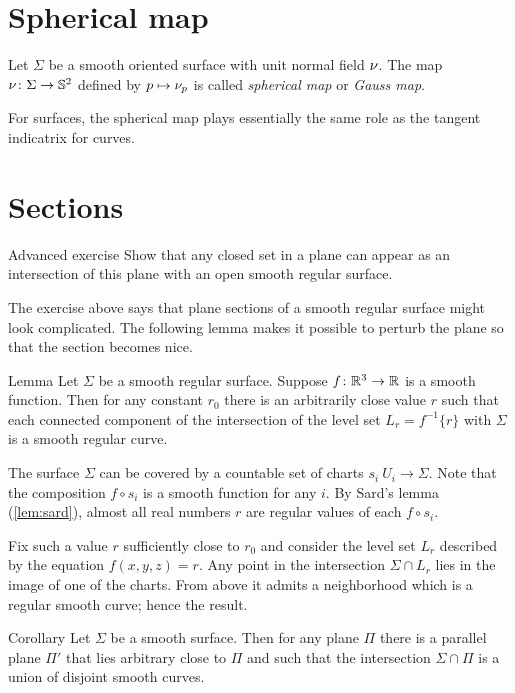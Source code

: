 
\section{Spherical map}

Let $\Sigma$ be a smooth oriented surface with unit normal field $\nu$.
The map $\nu\colon\Sigma\to \mathbb{S}^2$ defined by $p\mapsto \nu_p$ is called \emph{spherical map} or \emph{Gauss map}.

For surfaces, the spherical map plays essentially the same role as the tangent indicatrix for curves.

\section{Sections}%

\begin{thm}{Advanced exercise}\label{ex:plane-section}
Show that any closed set in a plane can appear as an intersection of this plane with an open smooth regular surface.  
\end{thm}

The exercise above says that plane sections of a smooth regular surface might look complicated.
The following lemma makes it possible to perturb the plane so that the section becomes nice.

\begin{thm}{Lemma}\label{lem:reg-section}
Let $\Sigma$ be a smooth regular surface.
Suppose $f\:\RR^3\z\to\RR$ is a smooth function.
Then for any constant $r_0$ there is an arbitrarily close value $r$ such that 
each connected component of the intersection of the level set $L_{r}=f^{-1}\{r\}$ with
$\Sigma$ is a smooth regular curve.
\end{thm}

The surface $\Sigma$ can be covered by a countable set of charts $s_i\:U_i\to \Sigma$.
Note that the composition $f\circ s_i$ is a smooth function for any $i$.
By Sard's lemma (\ref{lem:sard}), almost all real numbers $r$ are regular values of each $f\circ s_i$.

Fix such a value $r$ sufficiently close to $r_0$ and consider the level set $L_r$ described by the equation $f(x,y,z)=r$.
Any point in the intersection $\Sigma\cap L_r$ lies in the image of one of the charts.
From above it admits a neighborhood which is a regular smooth curve;
hence the result.\qeds

\begin{thm}{Corollary}
Let $\Sigma$ be a smooth surface.
Then for any plane $\Pi$ there is a parallel plane $\Pi'$ that lies arbitrary close to $\Pi$ and such that the intersection $\Sigma\cap\Pi$ is a union of disjoint smooth curves.
\end{thm}



